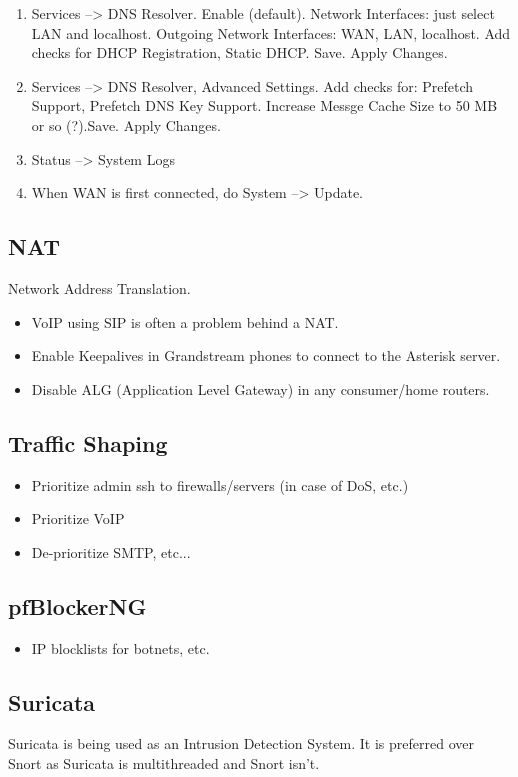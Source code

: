 \begin{enumerate}
 \item Services --> DNS Resolver. Enable (default). Network Interfaces: just select LAN and localhost. Outgoing Network Interfaces: WAN, LAN, localhost. Add checks for DHCP Registration, Static DHCP. Save. Apply Changes.
 \item Services --> DNS Resolver, Advanced Settings. Add checks for: Prefetch Support, Prefetch DNS Key Support. Increase Messge Cache Size to 50 MB or so (?).Save. Apply Changes.
 \item Status --> System Logs
 \item When WAN is first connected, do System --> Update.
\end{enumerate}


\subsection{NAT}
Network Address Translation.

\begin{itemize}
 \item VoIP using SIP is often a problem behind a NAT.
 \item Enable Keepalives in Grandstream phones to connect to the Asterisk server.
 \item Disable ALG (Application Level Gateway) in any consumer/home routers.
\end{itemize}


\subsection{Traffic Shaping}
\begin{itemize}
 \item Prioritize admin ssh to firewalls/servers (in case of DoS, etc.)
 \item Prioritize VoIP
 \item De-prioritize SMTP, etc...
\end{itemize}

\subsection{pfBlockerNG}
\begin{itemize}
 \item IP blocklists for botnets, etc.
\end{itemize}


\subsection{Suricata}
Suricata is being used as an Intrusion Detection System.
It is preferred over Snort as Suricata is multithreaded and Snort isn't.

